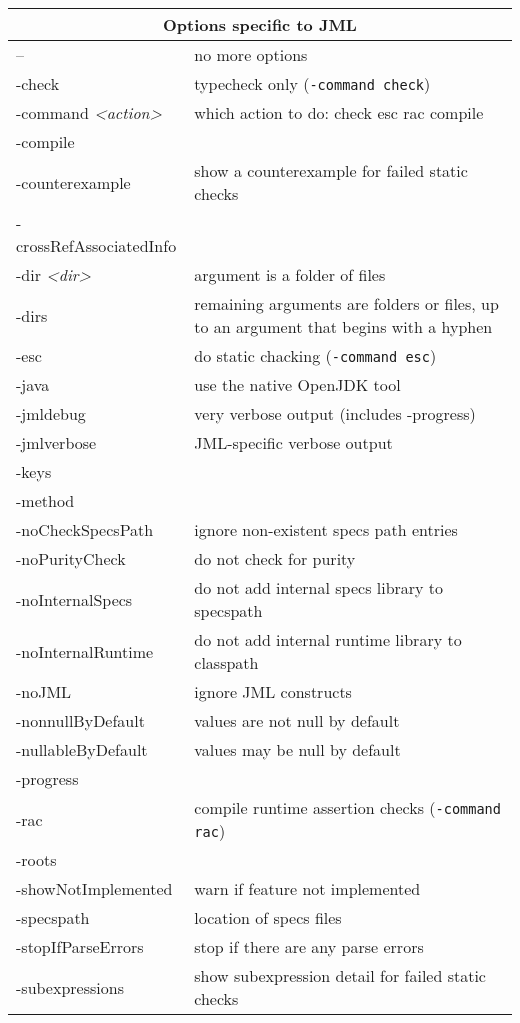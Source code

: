 \documentclass{report}%
\begin{document}
\begin{table} \small
\parbox{.5\textwidth}{
\begin{tabular}{|l|p{1.2in}|}
\hline
\multicolumn{2}{|c|}{Options specific to JML} \\
\hline
-- & no more options \\
-check & typecheck only ({\tt -command check})\\
-command {\it <action>}& which action to do: check esc rac compile\\
-compile & \\
-counterexample & show a counterexample for failed static checks\\
-crossRefAssociatedInfo & \\
-dir {\it <dir>} & argument is a folder of files \\
-dirs & remaining arguments are folders or files, up to an argument that begins with a hyphen\\
-esc & do static chacking ({\tt -command esc})\\
-java & use the native OpenJDK tool\\
-jmldebug & very verbose output (includes -progress) \\
-jmlverbose & JML-specific verbose output\\
-keys & \\
-method & \\
-noCheckSpecsPath & ignore non-existent specs path entries\\
-noPurityCheck & do not check for purity \\
-noInternalSpecs & do not add internal specs library to specspath \\
-noInternalRuntime & do not add internal runtime library to classpath \\
-noJML & ignore JML constructs \\
-nonnullByDefault & values are not null by default \\
-nullableByDefault & values may be null by default\\
-progress & \\
-rac & compile runtime assertion checks ({\tt -command rac})\\
-roots & \\
-showNotImplemented & warn if feature not implemented\\
-specspath & location of specs files\\
-stopIfParseErrors & stop if there are any parse errors \\
-subexpressions & show subexpression detail for failed static checks\\

\end{tabular}}
\end{table}
\end{document}
